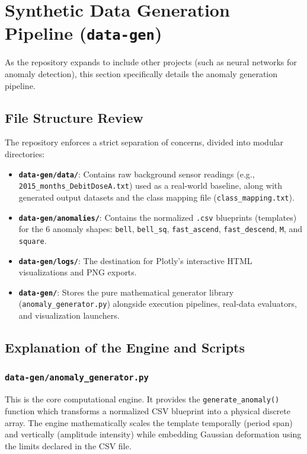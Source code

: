 \section{Synthetic Data Generation Pipeline (\texttt{data-gen})}
As the repository expands to include other projects (such as neural networks for anomaly detection), this section specifically details the anomaly generation pipeline.

\subsection{File Structure Review}
The repository enforces a strict separation of concerns, divided into modular directories:

\begin{itemize}
    \item \textbf{\texttt{data-gen/data/}}: Contains raw background sensor readings (e.g., \texttt{2015\_months\_DebitDoseA.txt}) used as a real-world baseline, along with generated output datasets and the class mapping file (\texttt{class\_mapping.txt}).
    \item \textbf{\texttt{data-gen/anomalies/}}: Contains the normalized \texttt{.csv} blueprints (templates) for the 6 anomaly shapes: \texttt{bell}, \texttt{bell\_sq}, \texttt{fast\_ascend}, \texttt{fast\_descend}, \texttt{M}, and \texttt{square}.
    \item \textbf{\texttt{data-gen/logs/}}: The destination for Plotly's interactive HTML visualizations and PNG exports.
    \item \textbf{\texttt{data-gen/}}: Stores the pure mathematical generator library (\texttt{anomaly\_generator.py}) alongside execution pipelines, real-data evaluators, and visualization launchers.
\end{itemize}

\subsection{Explanation of the Engine and Scripts}

\subsubsection{\texttt{data-gen/anomaly\_generator.py}}
This is the core computational engine. It provides the \texttt{generate\_anomaly()} function which transforms a normalized CSV blueprint into a physical discrete array. The engine mathematically scales the template temporally (period span) and vertically (amplitude intensity) while embedding Gaussian deformation using the limits declared in the CSV file.

